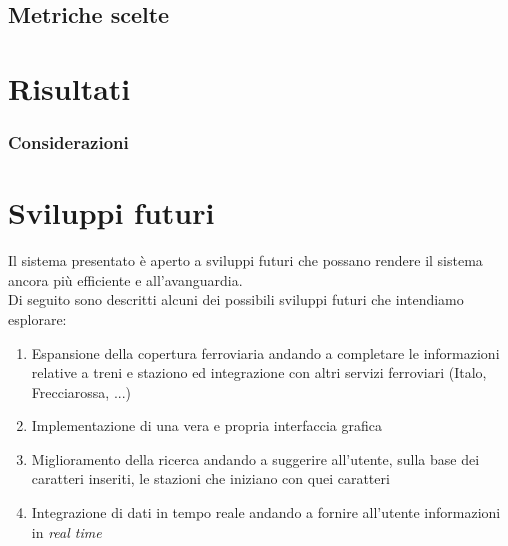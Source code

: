 \documentclass[italian,12pt,a4paper]{article}
\begin{document}
	
	\subsection{Metriche scelte}


	\section{Risultati}


	
	\subsubsection{Considerazioni}
	
	\section{Sviluppi futuri}
	Il sistema presentato è aperto a sviluppi futuri che possano rendere il sistema ancora più efficiente e all'avanguardia. \\
	Di seguito sono descritti alcuni dei possibili sviluppi futuri che intendiamo esplorare:
	
	\begin{enumerate}
		\item Espansione della copertura ferroviaria andando a completare le informazioni relative a treni e staziono ed integrazione con altri servizi ferroviari (Italo, Frecciarossa, ...)
		\item Implementazione di una vera e propria interfaccia grafica
		\item Miglioramento della ricerca andando a suggerire all'utente, sulla base dei caratteri inseriti, le stazioni che iniziano con quei caratteri
		\item Integrazione di dati in tempo reale andando a fornire all'utente informazioni in \textit{real time}

	\end{enumerate}
	
	
\end{document}
